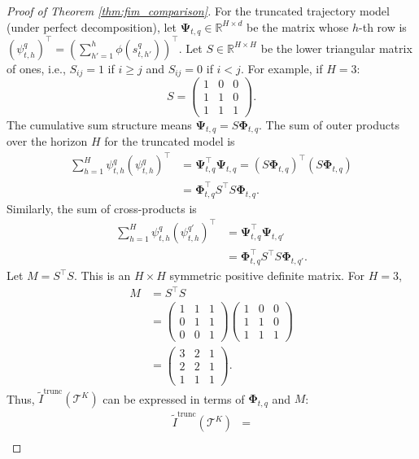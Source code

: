 \documentclass{article}
\newcommand{\bPsi}{\mathbf{\Psi}}
\newcommand{\bPhi}{\mathbf{\Phi}}
\begin{document}
\begin{proof}[Proof of Theorem \ref{thm:fim_comparison}]
For the truncated trajectory model (under perfect decomposition), let $\bPsi_{t,q} \in \mathbb{R}^{H \times d}$ be the matrix whose $h$-th row is $(\psi^q_{t,h})^\top = \left(\sum_{h'=1}^h \phi(s^q_{t,h'})\right)^\top$.
Let $S \in \mathbb{R}^{H \times H}$ be the lower triangular matrix of ones, i.e., $S_{ij}=1$ if $i \ge j$ and $S_{ij}=0$ if $i < j$. For example, if $H=3$:
\[ S = \begin{pmatrix} 1 & 0 & 0 \\ 1 & 1 & 0 \\ 1 & 1 & 1 \end{pmatrix}. \]
The cumulative sum structure means $\bPsi_{t,q} = S \bPhi_{t,q}$.
The sum of outer products over the horizon $H$ for the truncated model is
\begin{align*}
\sum_{h=1}^H \psi^q_{t,h}(\psi^q_{t,h})^\top
&= \bPsi_{t,q}^\top \bPsi_{t,q}
 = (S \bPhi_{t,q})^\top (S \bPhi_{t,q}) \\
&= \bPhi_{t,q}^\top S^\top S \bPhi_{t,q}.
\end{align*}
Similarly, the sum of cross-products is
\begin{align*}
\sum_{h=1}^H \psi^q_{t,h}(\psi^{q'}_{t,h})^\top
&= \bPsi_{t,q}^\top \bPsi_{t,q'} \\
&= \bPhi_{t,q}^\top S^\top S \bPhi_{t,q'}.
\end{align*}
Let $M = S^\top S$. This is an $H \times H$ symmetric positive definite matrix. For $H=3$,
\begin{align*}
M &= S^\top S \\
&= \begin{pmatrix} 1 & 1 & 1 \\ 0 & 1 & 1 \\ 0 & 0 & 1 \end{pmatrix}
   \begin{pmatrix} 1 & 0 & 0 \\ 1 & 1 & 0 \\ 1 & 1 & 1 \end{pmatrix} \\
&= \begin{pmatrix} 3 & 2 & 1 \\ 2 & 2 & 1 \\ 1 & 1 & 1 \end{pmatrix}.
\end{align*}
Thus, $\tilde{I}^{\text{trunc}}(\mathcal{T}^K)$ can be expressed in terms of $\bPhi_{t,q}$ and $M$:
\begin{align*}
\tilde{I}^{\text{trunc}}(\mathcal{T}^K)
&= \\

\end{align*}
\end{proof}
\end{document}
